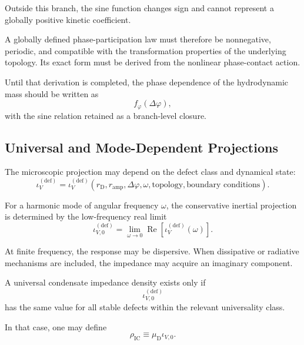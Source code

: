 Outside this branch, the sine function changes sign and cannot represent a globally positive kinetic coefficient.

A globally defined phase-participation law must therefore be nonnegative, periodic, and compatible with the transformation properties of the underlying topology. Its exact form must be derived from the nonlinear phase-contact action.

Until that derivation is completed, the phase dependence of the hydrodynamic mass should be written as
\begin{equation}
    \boxed{ f_{\varphi}(\Delta\varphi) },
\end{equation}
with the sine relation retained as a branch-level closure.

\subsection{Universal and Mode-Dependent Projections}

The microscopic projection may depend on the defect class and dynamical state:
\begin{equation}
    \iota_V^{(\mathrm{def})} = \iota_V^{(\mathrm{def})} \left( r_{\mathrm{D}}, r_{\mathrm{amp}}, \Delta\varphi, \omega, \text{topology}, \text{boundary conditions} \right).
\end{equation}

For a harmonic mode of angular frequency $\omega$, the conservative inertial projection is determined by the low-frequency real limit
\begin{equation}
    \boxed{ \iota_{V,0}^{(\mathrm{def})} = \lim_{\omega\rightarrow 0} \operatorname{Re} \left[ \iota_V^{(\mathrm{def})}(\omega) \right] }.
\end{equation}

At finite frequency, the response may be dispersive. When dissipative or radiative mechanisms are included, the impedance may acquire an imaginary component.

A universal condensate impedance density exists only if
\begin{equation}
    \iota_{V,0}^{(\mathrm{def})}
\end{equation}
has the same value for all stable defects within the relevant universality class.

In that case, one may define
\begin{equation}
    \boxed{ \rho_{\mathrm{IC}} \equiv \mu_{\mathrm{D}}\iota_{V,0} }.
\end{equation}

